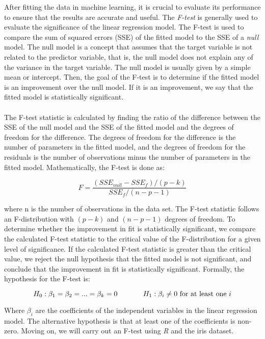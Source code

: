 \documentclass{article}[12pt]
\theoremstyle{definition}
\begin{document}
\bigskip

After fitting the data in machine learning, it is crucial to evaluate its performance to ensure that the results are accurate and useful. The \emph{F-test} is generally used to evaluate the significance of the linear regression model. The F-test is used to compare the sum of squared errors (SSE) of the fitted model to the SSE of a \emph{null} model. The null model is a concept that assumes that the target variable is not related to the predictor variable, that is, the null model does not explain any of the variance in the target variable. The null model is usually given by a simple mean or intercept. Then, the goal of the F-test is to determine if the fitted model is an improvement over the null model. If it is an improvement, we say that the fitted model is statistically significant. 
\\
\\
The F-test statistic is calculated by finding the ratio of the difference between the SSE of the null model and the SSE of the fitted model and the degrees of freedom for the difference. The degrees of freedom for the difference is the number of parameters in the fitted model, and the degrees of freedom for the residuals is the number of observations minus the number of parameters in the fitted model. Mathematically, the F-test is done as: 

\medskip

$$ F = \frac{(SSE_{null} - SSE_f) / (p-k)}{SSE_f / (n-p-1)}$$

\medskip

\noindent
where n is the number of observations in the data set. The F-test statistic follows an F-distribution with $(p-k)$ and $(n-p-1)$ degrees of freedom. To determine whether the improvement in fit is statistically significant, we compare the calculated F-test statistic to the critical value of the F-distribution for a given level of significance. If the calculated F-test statistic is greater than the critical value, we reject the null hypothesis that the fitted model is not significant, and conclude that the improvement in fit is statistically significant. Formally, the hypothesis for the F-test is: 

\medskip

$$ H_0 : \beta_1 = \beta_2 = ... = \beta_k = 0 \hspace{0.5in}  H_1 : \beta_i \neq 0 \text{ for at least one } i $$

\medskip

\noindent
Where $\beta_i$ are the coefficients of the independent variables in the linear regression model. The alternative hypothesis is that at least one of the coefficients is non-zero. Moving on, we will carry out an F-test using \emph{R} and the iris dataset. 
\end{document}
